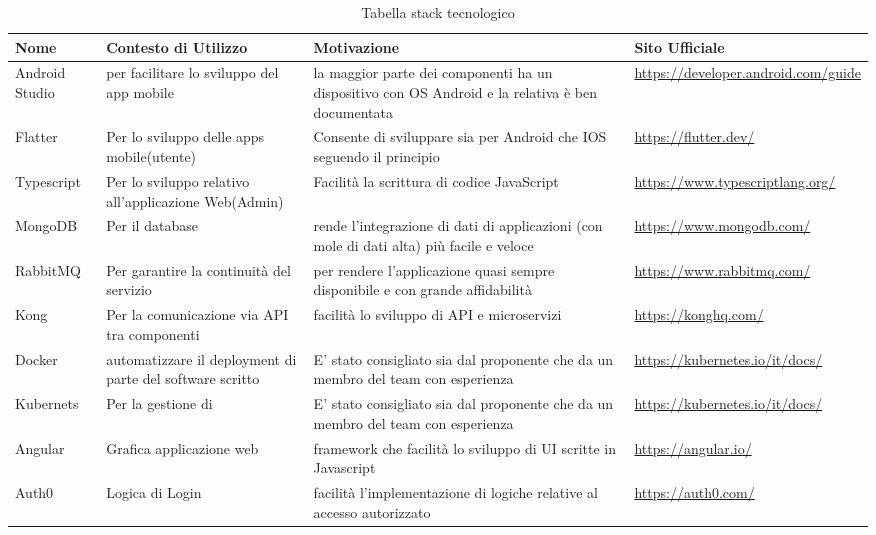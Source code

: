 \hypertarget{ProcessiPrimari}{}
\begin{longtable}{ C{1.5cm} C{3cm} C{5cm} C{3.5cm} }
    \caption{Tabella stack tecnologico}                                                                                 \\
    \rowcolor{\primaryColor}
    \textcolor{\secondaryColor}{\textbf{Nome}} & \textcolor{\secondaryColor}{\textbf{Contesto di Utilizzo}} & \textcolor{\secondaryColor}{\textbf{Motivazione}} & \textcolor{\secondaryColor}{\textbf{Sito Ufficiale}}\\ \endhead
    {Android Studio} & { per facilitare lo sviluppo del app mobile}   & {la maggior parte dei componenti ha un dispositivo con OS Android e la relativa  è ben documentata} & {\url{https://developer.android.com/guide}}\\
    {Flatter} & {Per lo sviluppo delle apps mobile(utente)} & {Consente di sviluppare sia per Android che IOS seguendo il principio  } & {\url{https://flutter.dev/}}\\
    {Typescript} & {Per lo sviluppo relativo all'applicazione Web(Admin)} & { Facilità la scrittura di codice JavaScript } & {\url{https://www.typescriptlang.org/}}\\
    {MongoDB} & {Per il database} & { rende l'integrazione di dati di applicazioni (con mole di dati alta) più facile e veloce} & {\url{https://www.mongodb.com/}}\\
    {RabbitMQ} & {Per garantire la continuità del servizio} & {per rendere l'applicazione quasi sempre disponibile e con grande affidabilità} & {\url{https://www.rabbitmq.com/}}\\
    {Kong} & {Per la comunicazione via API tra componenti} & {facilità lo sviluppo di API e microservizi} & {\url{https://konghq.com/}}\\
    {Docker} & {automatizzare il deployment di parte del software scritto} & {E’ stato consigliato sia dal proponente che da un membro del team con esperienza} & {\url{https://kubernetes.io/it/docs/}}\\
    {Kubernets} & {Per la gestione di } & {E’ stato consigliato sia dal proponente che da un membro del team con esperienza} & {\url{https://kubernetes.io/it/docs/}}\\
    {Angular} & {Grafica applicazione web} & {framework che facilità lo sviluppo di UI scritte in Javascript} & {\url{https://angular.io/}}\\
    {Auth0} & {Logica di Login} & {facilità l'implementazione di logiche relative al accesso autorizzato} & {\url{https://auth0.com/}}\\

\end{longtable}
